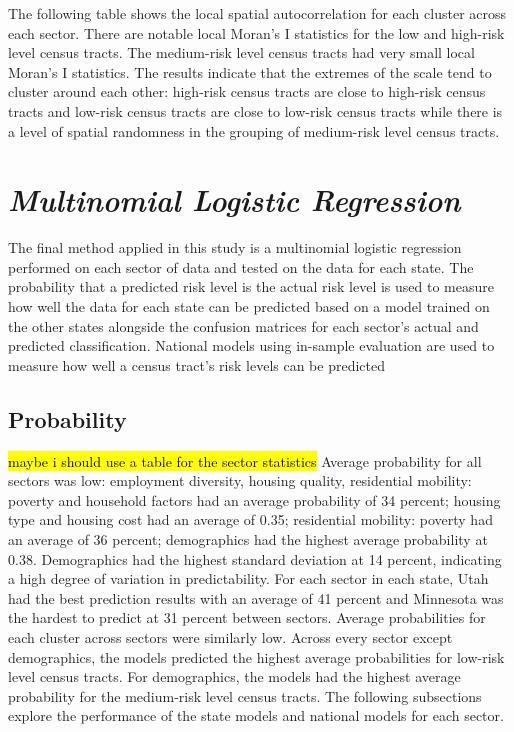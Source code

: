 The following table shows the local spatial autocorrelation for each cluster across each sector. There are notable local Moran's I statistics for the low and high-risk level census tracts. The medium-risk level census tracts had very small local Moran's I statistics. The results indicate that the extremes of the scale tend to cluster around each other: high-risk census tracts are close to high-risk census tracts and low-risk census tracts are close to low-risk census tracts while there is a level of spatial randomness in the grouping of medium-risk level census tracts. 



\section{\textit{Multinomial Logistic Regression}}

The final method applied in this study is a multinomial logistic regression performed on each sector of data and tested on the data for each state. The probability that a predicted risk level is the actual risk level is used to measure how well the data for each state can be predicted based on a model trained on the other states alongside the confusion matrices for each sector's actual and predicted classification. National models using in-sample evaluation are used to measure how well a census tract's risk levels can be predicted

\subsection{Probability}

\hl{maybe i should use a table for the sector statistics}
Average probability for all sectors was low: employment diversity, housing quality, residential mobility: poverty and household factors had an average probability of 34 percent; housing type and housing cost had an average of 0.35; residential mobility: poverty had an average of 36 percent; demographics had the highest average probability at 0.38. Demographics had the highest standard deviation at 14 percent, indicating a high degree of variation in predictability. For each sector in each state, Utah had the best prediction results with an average of 41 percent and Minnesota was the hardest to predict at 31 percent between sectors. Average probabilities for each cluster across sectors were similarly low. Across every sector except demographics, the models predicted the highest average probabilities for low-risk level census tracts. For demographics, the models had the highest average probability for the medium-risk level census tracts. The following subsections explore the performance of the state models and national models for each sector. 

